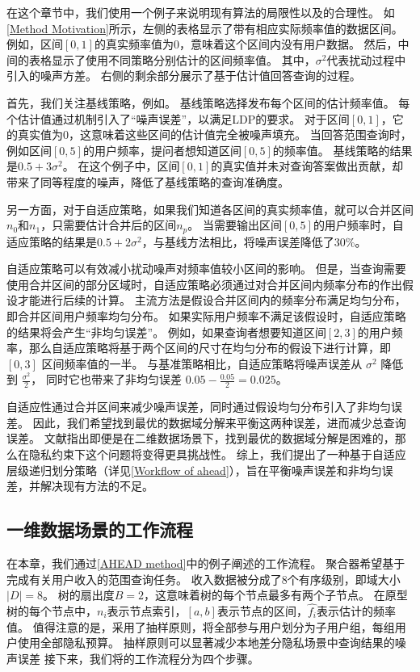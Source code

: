 在这个章节中，我们使用一个例子来说明现有算法的局限性以及\myahead 的合理性。
如\autoref{Method Motivation}所示，左侧的表格显示了带有相应实际频率值的数据区间。
例如，区间$[0,1]$的真实频率值为$0$，意味着这个区间内没有用户数据。
然后，中间的表格显示了使用不同策略分别估计的区间频率值。
其中，$\sigma^2$代表扰动过程中引入的噪声方差。
右侧的剩余部分展示了基于估计值回答查询的过程。

首先，我们关注基线策略，例如\myhio。
基线策略选择发布每个区间的估计频率值。
每个估计值通过\fo 机制引入了“噪声误差”，以满足LDP的要求。
对于区间$[0,1]$，它的真实值为$0$，这意味着这些区间的估计值完全被噪声填充。
当回答范围查询时，例如区间$[0,5]$的用户频率，提问者想知道区间$[0,5]$的频率值。
基线策略的结果是$0.5 + 3\sigma^2$。
在这个例子中，区间$[0,1]$的真实值并未对查询答案做出贡献，却带来了同等程度的噪声，降低了基线策略的查询准确度。

另一方面，对于自适应策略，如果我们知道各区间的真实频率值，就可以合并区间$n_0$和$n_1$，只需要估计合并后的区间$n_p$。
当需要输出区间$[0,5]$的用户频率时，自适应策略的结果是$0.5 + 2\sigma^2$，与基线方法相比，将噪声误差降低了30\%。

自适应策略可以有效减小扰动噪声对频率值较小区间的影响。
但是，当查询需要使用合并区间的部分区域时，自适应策略必须通过对合并区间内频率分布的作出假设才能进行后续的计算。
主流方法是假设合并区间内的频率分布满足均匀分布\cite{ioannidis2003history}，即合并区间用户频率均匀分布。
如果实际用户频率不满足该假设时，自适应策略的结果将会产生“非均匀误差”。
例如，如果查询者想要知道区间$[2,3]$的用户频率，那么自适应策略将基于两个区间的尺寸在均匀分布的假设下进行计算，即 $[0,3]$ 区间频率值的一半。
与基准策略相比，自适应策略将噪声误差从 $\sigma^2$ 降低到 $\frac{\sigma^2}{2}$，
同时它也带来了非均匀误差 $0.05 - \frac{0.05}{2} = 0.025$。

自适应性通过合并区间来减少噪声误差，同时通过假设均匀分布引入了非均匀误差。
因此，我们希望找到最优的数据域分解来平衡这两种误差，进而减少总查询误差。
文献\cite{muthukrishnan1999rectangular}指出即便是在二维数据场景下，找到最优的数据域分解是困难的，那么在隐私约束下这个问题将变得更具挑战性。 
综上，我们提出了一种基于自适应层级递归划分策略（详见\autoref{Workflow of ahead}），旨在平衡噪声误差和非均匀误差，并解决现有方法的不足。

\subsection{一维数据场景\myahead 的工作流程}
\label{Workflow of ahead}
在本章，我们通过\autoref{AHEAD method}中的例子阐述\myahead 的工作流程。
聚合器希望基于\myahead 完成有关用户收入的范围查询任务。
收入数据被分成了8个有序级别，即域大小$|D|=8$。
树的扇出度$B=2$，这意味着\myahead 树的每个节点最多有两个子节点。
在\myahead 原型树的每个节点中，$n_i$表示节点索引，$[a,b]$表示节点的区间，$\hat{f_i}$表示估计的频率值。
值得注意的是，\myahead 采用了抽样原则\cite{cormode2019answering}，将全部参与用户划分为子用户组，每组用户使用全部隐私预算。
抽样原则可以显著减少本地差分隐私场景中查询结果的噪声误差\cite{nguyen2016collecting, wang2017locally, wang2019locally}
接下来，我们将\myahead 的工作流程分为四个步骤。

